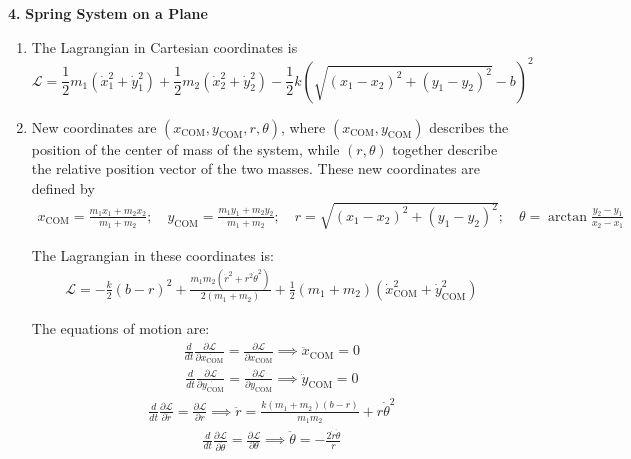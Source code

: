 \documentclass{article}
\theoremstyle{definition}
\newcommand{\p}{\partial}
\newcommand{\lag}{\mathcal{L}}
\newcommand{\f}[2]{\frac{#1}{#2}}
\newcommand{\lp}{\left(}
\newcommand{\rp}{\right)}
\begin{document}
\newpage
\noindent \textbf{4.} \textbf{Spring System on a Plane}

\begin{enumerate}[label = (\alph*)]
	\item The Lagrangian in Cartesian coordinates is 
	\begin{equation*}
	\boxed{
	\lag = \f{1}{2}m_1(\dot{x}_1^2 + \dot{y}_1^2)+ \f{1}{2}m_2(\dot{x}_2^2 + \dot{y}_2^2) - \f{1}{2}k \lp \sqrt{(x_1-x_2)^2+(y_1-y_2)^2} -b \rp^2
	}
	\end{equation*}
	
	
	
	
	\item New coordinates are  $(x_\text{COM},y_{\text{COM}},r,\theta)$, where $(x_\text{COM}, y_\text{COM})$ describes the position of the center of mass of the system, while $(r,\theta)$ together describe the relative position vector of the two masses. These new coordinates are defined by 
	\begin{align*}
	x_\text{COM} = \f{m_1 x_1 + m_2 x_2}{m_1+m_2}; \quad y_\text{COM} = \f{m_1 y_1 + m_2 y_2}{m_1+m_2}; \quad r= \sqrt{(x_1-x_2)^2+(y_1-y_2)^2}; \quad \theta = \arctan\f{y_2-y_1}{x_2-x_1}
	\end{align*}
	
	
	The Lagrangian in these coordinates is:
	\begin{align*}
	\lag = -\f{k}{2} (b-r)^2+\frac{m_1m_2 \left(\dot r^2+r^2 \dot\theta^2\right)}{2(m_1+m_2)}
	+\frac{1}{2}(m_1+m_2) \left(\dot{x}_\text{COM}^2+\dot{y}_\text{COM}^2\right)
	\end{align*}
	
	The equations of motion are:
	\begin{align*}
	\f{d}{dt}\f{\p \lag}{\p \dot{x_\text{COM}}} = \f{\p \lag}{\p x_\text{COM}}
	\implies \ddot{x}_\text{COM} = 0
	\end{align*}
	\begin{align*}
	\f{d}{dt}\f{\p \lag}{\p \dot{y_\text{COM}}} = \f{\p \lag}{\p y_\text{COM}} \implies \ddot{y}_\text{COM} = 0
	\end{align*}
	\begin{align*}
	\f{d}{dt}\f{\p \lag}{\p \dot{r}} = \f{\p \lag}{\p r}
	\implies \ddot{r} = \f{k(m_1+m_2)(b-r)}{m_1m_2} + r\dot{\theta}^2
	\end{align*}
	\begin{align*}
	\f{d}{dt}\f{\p \lag}{\p \dot{\theta}} = \f{\p \lag}{\p \theta}\implies \ddot{\theta}  = -\f{2\dot{r}\dot{\theta}}{r}
	\end{align*}


\end{enumerate}
\end{document}
